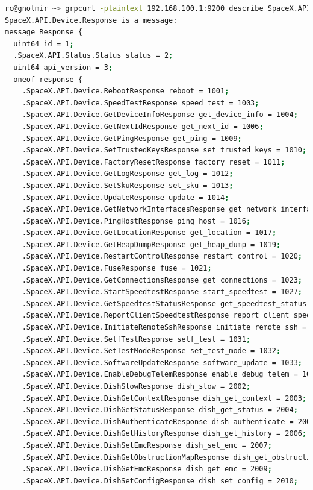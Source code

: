 \documentclass[IN,11pt,twoside,openright,bachelor,english]{tumthesis}
\begin{document}
\begin{lstlisting}[language=bash,basicstyle=\tiny]
rc@gnolmir ~> grpcurl -plaintext 192.168.100.1:9200 describe SpaceX.API.Device.Response
SpaceX.API.Device.Response is a message:
message Response {
  uint64 id = 1;
  .SpaceX.API.Status.Status status = 2;
  uint64 api_version = 3;
  oneof response {
    .SpaceX.API.Device.RebootResponse reboot = 1001;
    .SpaceX.API.Device.SpeedTestResponse speed_test = 1003;
    .SpaceX.API.Device.GetDeviceInfoResponse get_device_info = 1004;
    .SpaceX.API.Device.GetNextIdResponse get_next_id = 1006;
    .SpaceX.API.Device.GetPingResponse get_ping = 1009;
    .SpaceX.API.Device.SetTrustedKeysResponse set_trusted_keys = 1010;
    .SpaceX.API.Device.FactoryResetResponse factory_reset = 1011;
    .SpaceX.API.Device.GetLogResponse get_log = 1012;
    .SpaceX.API.Device.SetSkuResponse set_sku = 1013;
    .SpaceX.API.Device.UpdateResponse update = 1014;
    .SpaceX.API.Device.GetNetworkInterfacesResponse get_network_interfaces = 1015;
    .SpaceX.API.Device.PingHostResponse ping_host = 1016;
    .SpaceX.API.Device.GetLocationResponse get_location = 1017;
    .SpaceX.API.Device.GetHeapDumpResponse get_heap_dump = 1019;
    .SpaceX.API.Device.RestartControlResponse restart_control = 1020;
    .SpaceX.API.Device.FuseResponse fuse = 1021;
    .SpaceX.API.Device.GetConnectionsResponse get_connections = 1023;
    .SpaceX.API.Device.StartSpeedtestResponse start_speedtest = 1027;
    .SpaceX.API.Device.GetSpeedtestStatusResponse get_speedtest_status = 1028;
    .SpaceX.API.Device.ReportClientSpeedtestResponse report_client_speedtest = 1029;
    .SpaceX.API.Device.InitiateRemoteSshResponse initiate_remote_ssh = 1030 [deprecated = true];
    .SpaceX.API.Device.SelfTestResponse self_test = 1031;
    .SpaceX.API.Device.SetTestModeResponse set_test_mode = 1032;
    .SpaceX.API.Device.SoftwareUpdateResponse software_update = 1033;
    .SpaceX.API.Device.EnableDebugTelemResponse enable_debug_telem = 1034;
    .SpaceX.API.Device.DishStowResponse dish_stow = 2002;
    .SpaceX.API.Device.DishGetContextResponse dish_get_context = 2003;
    .SpaceX.API.Device.DishGetStatusResponse dish_get_status = 2004;
    .SpaceX.API.Device.DishAuthenticateResponse dish_authenticate = 2005;
    .SpaceX.API.Device.DishGetHistoryResponse dish_get_history = 2006;
    .SpaceX.API.Device.DishSetEmcResponse dish_set_emc = 2007;
    .SpaceX.API.Device.DishGetObstructionMapResponse dish_get_obstruction_map = 2008;
    .SpaceX.API.Device.DishGetEmcResponse dish_get_emc = 2009;
    .SpaceX.API.Device.DishSetConfigResponse dish_set_config = 2010;

\end{lstlisting}
\end{document}
